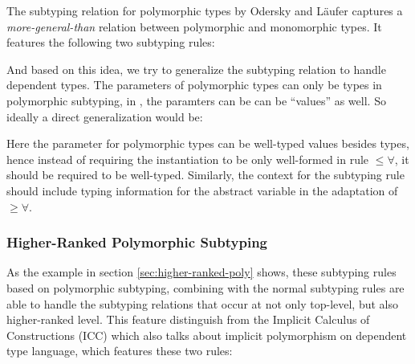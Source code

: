 The subtyping relation for polymorphic types by Odersky and L\"aufer\cite{odersky1996putting}
captures a \emph{more-general-than} relation between polymorphic and monomorphic
types. It features the following two subtyping rules:


And based on this idea, we try to generalize the subtyping relation to handle
dependent types. The parameters of polymorphic types can only be types in
polymorphic subtyping, in \name, the paramters can be can be ``values'' as well.
So ideally a direct generalization would be:


Here the parameter for polymorphic types can be well-typed values besides types,
hence instead of requiring the instantiation to be only well-formed in rule
$\le\forall$, it should be required to be well-typed. Similarly, the context
for the subtyping rule should include typing information for the abstract variable
in the adaptation of $\ge\forall$.

\subsubsection{Higher-Ranked Polymorphic Subtyping}

As the example in section \ref{sec:higher-ranked-poly} shows, these subtyping
rules based on polymorphic subtyping, combining with the normal subtyping rules
are able to handle the subtyping relations that occur at not only top-level,
but also higher-ranked level. This feature distinguish \name from the Implicit
Calculus of Constructions (ICC) \cite{miquel2001implicit} which also talks about
implicit polymorphism on dependent type language, which features these two rules:

